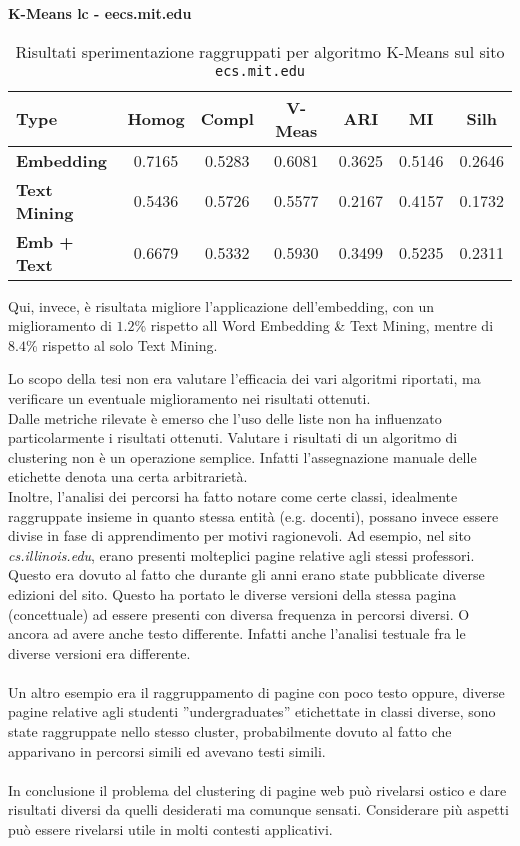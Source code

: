 \textbf{K-Means lc - eecs.mit.edu}
\begin{table}[H]
	\begin{tabular}{| l | c | c | c | c | c | c |}
	\hline
	\textbf{Type}  & \textbf{Homog} & \textbf{Compl} & \textbf{V-Meas}  & \textbf{ARI}  & \textbf{MI}  & \textbf{Silh} \\ [3ex] \hline
	\textbf{Embedding} & 0.7165 & 0.5283 & 0.6081 & 0.3625 & 0.5146 & 0.2646\\ [3ex]
	 \hline 
	\textbf{Text Mining} & 0.5436 & 0.5726 & 0.5577 & 0.2167 & 0.4157 & 0.1732\\ [3ex]
	 \hline
	\textbf{Emb + Text} & 0.6679 & 0.5332 & 0.5930 & 0.3499 & 0.5235 & 0.2311\\ [3ex]
	 \hline
	\end{tabular}
	\caption{Risultati sperimentazione raggruppati per algoritmo K-Means sul sito \texttt{ecs.mit.edu}}
	\label{metricheTextEmbedKmeansLcMit}
\end{table}

Qui, invece, è risultata migliore l'applicazione dell'embedding, con un miglioramento di $1.2$\% rispetto all Word Embedding \& Text Mining, mentre di $8.4$\% rispetto al solo Text Mining.

Lo scopo della tesi non era valutare l'efficacia dei vari algoritmi riportati, ma verificare un eventuale miglioramento nei risultati ottenuti.
\\
Dalle metriche rilevate è emerso che l'uso delle liste non ha influenzato particolarmente i risultati ottenuti.
Valutare i risultati di un algoritmo di clustering non è un operazione semplice. Infatti l'assegnazione manuale delle etichette denota una certa arbitrarietà. 
\\
Inoltre, l'analisi dei percorsi ha fatto notare come certe classi, idealmente raggruppate insieme in quanto stessa entità (e.g. docenti), possano invece essere divise in fase di apprendimento per motivi ragionevoli. Ad esempio, nel sito \textit{cs.illinois.edu}, erano presenti molteplici pagine relative agli stessi professori. Questo era dovuto al fatto che durante gli anni erano state pubblicate diverse edizioni del sito. Questo ha portato le diverse versioni della stessa pagina (concettuale) ad essere presenti con diversa frequenza in percorsi diversi. O ancora ad avere anche testo differente. Infatti anche l'analisi testuale fra le diverse versioni era differente. 
\\\\
Un altro esempio era il raggruppamento di pagine con poco testo oppure, diverse pagine relative agli studenti ''undergraduates'' etichettate in classi diverse, sono state raggruppate nello stesso cluster, probabilmente dovuto al fatto che apparivano in percorsi simili ed avevano testi simili.
\\\\
In conclusione il problema del clustering di pagine web può rivelarsi ostico e dare risultati diversi da quelli desiderati ma comunque sensati. Considerare più aspetti può essere rivelarsi utile in molti contesti applicativi.

